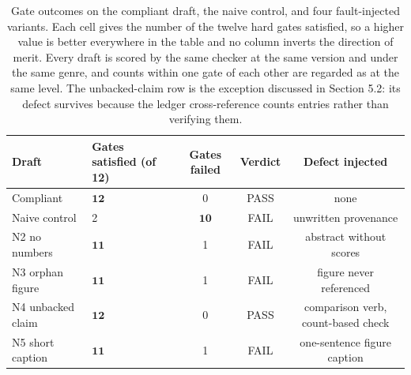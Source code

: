 \begin{table}[t]
\centering
\caption{Gate outcomes on the compliant draft, the naive control, and four fault-injected variants. Each cell gives the number of the twelve hard gates satisfied, so a higher value is better everywhere in the table and no column inverts the direction of merit. Every draft is scored by the same checker at the same version and under the same genre, and counts within one gate of each other are regarded as at the same level. The unbacked-claim row is the exception discussed in Section 5.2: its defect survives because the ledger cross-reference counts entries rather than verifying them.}
\label{tab:gate-outcomes}
\begin{tabular}{llccc}
\toprule
\textbf{Draft} & \textbf{Gates satisfied (of 12)} & \textbf{Gates failed} & \textbf{Verdict} & \textbf{Defect injected} \\
\midrule
Compliant & $\mathbf{12}$ & 0 & PASS & none \\
Naive control & 2 & $\mathbf{10}$ & FAIL & unwritten provenance \\
N2 no numbers & $\mathbf{11}$ & 1 & FAIL & abstract without scores \\
N3 orphan figure & $\mathbf{11}$ & 1 & FAIL & figure never referenced \\
N4 unbacked claim & $\mathbf{12}$ & 0 & PASS & comparison verb, count-based check \\
N5 short caption & $\mathbf{11}$ & 1 & FAIL & one-sentence figure caption \\
\bottomrule
\end{tabular}
\par\vspace{2pt}{\footnotesize 'PASS' denotes that all twelve gates were satisfied, not that the draft is deliverable; see Section 5.2.}
\end{table}
